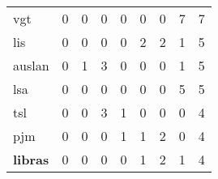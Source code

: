 \begin{table}[]
{\begin{tabular}{l|ccccccc|c}
            \acrshort{vgt}                                                                                        & 0                                                & 0                         & 0                          & 0                          & 0                          & 0                          & \cellcolor[HTML]{FFF5E1}7  & 7                                               \\
            \acrshort{lis}                                                                                        & 0                                                & 0                         & 0                          & 0                          & \cellcolor[HTML]{FFFCF6}2  & \cellcolor[HTML]{FFFCF6}2  & \cellcolor[HTML]{FFFEFB}1  & 5                                               \\
            \acrshort{auslan}                                                                                     & 0                                                & \cellcolor[HTML]{FFFEFB}1 & \cellcolor[HTML]{FFFBF2}3  & 0                          & 0                          & 0                          & \cellcolor[HTML]{FFFEFB}1  & 5                                               \\
            \acrshort{lsa}                                                                                        & 0                                                & 0                         & 0                          & 0                          & 0                          & 0                          & \cellcolor[HTML]{FFF8EA}5  & 5                                               \\
            \acrshort{tsl}                                                                                        & 0                                                & 0                         & \cellcolor[HTML]{FFFBF2}3  & \cellcolor[HTML]{FFFEFB}1  & 0                          & 0                          & 0                          & 4                                               \\
            \acrshort{pjm}                                                                                        & 0                                                & 0                         & 0                          & \cellcolor[HTML]{FFFEFB}1  & \cellcolor[HTML]{FFFEFB}1  & \cellcolor[HTML]{FFFCF6}2  & 0                          & 4                                               \\
            \textbf{\acrshort{libras}}                                                                            & 0                                                & 0                         & 0                          & 0                          & \cellcolor[HTML]{FFFEFB}1  & \cellcolor[HTML]{FFFCF6}2  & \cellcolor[HTML]{FFFEFB}1  & 4                                               \\

\end{tabular}}
\end{table}
